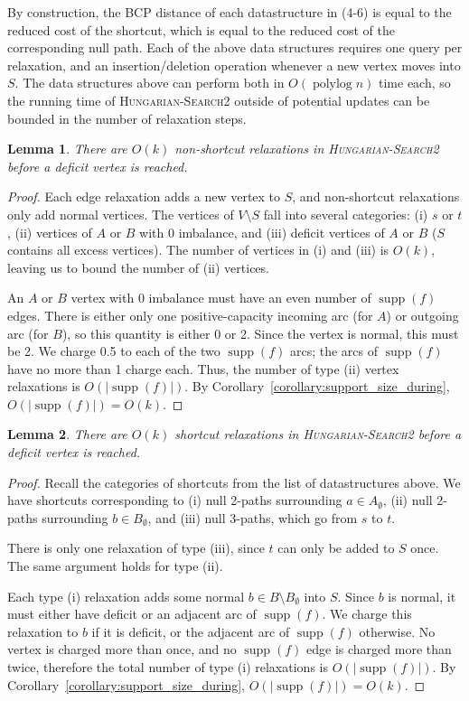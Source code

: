 \documentclass[11pt]{article}
\def\polylog{\mathop{\mathrm{polylog}}}
\def\supp{\operatorname{supp}}
\theoremstyle{plain}
\newtheorem{lemma}{Lemma}[section]
\numberwithin{figure}{section}
\begin{document}
By construction, the BCP distance of each datastructure in (4-6) is equal to
the reduced cost of the shortcut, which is equal to the reduced cost of the
corresponding null path.
Each of the above data structures requires one query per relaxation, and an
insertion/deletion operation whenever a new vertex moves into $S$.
The data structures above can perform both in $O(\polylog n)$ time each, so the
running time of \textsc{Hungarian-Search2} outside of potential updates can be
bounded in the number of relaxation steps.

\begin{lemma}
\label{lemma:goldberg_hs_length1}
There are $O(k)$ non-shortcut relaxations in \textsc{Hungarian-Search2} before
a deficit vertex is reached.
\end{lemma}

\begin{proof}
Each edge relaxation adds a new vertex to $S$, and non-shortcut relaxations
only add normal vertices.
The vertices of $V \setminus S$ fall into several categories:
(i) $s$ or $t$, (ii) vertices of $A$ or $B$ with 0 imbalance, and (iii)
deficit vertices of $A$ or $B$ ($S$ contains all excess vertices).
The number of vertices in (i) and (iii) is $O(k)$, leaving us to bound the
number of (ii) vertices.

An $A$ or $B$ vertex with 0 imbalance must have an even number of $\supp(f)$
edges.
There is either only one positive-capacity incoming arc (for $A$) or outgoing
arc (for $B$), so this quantity is either 0 or 2.
Since the vertex is normal, this must be 2.
We charge 0.5 to each of the two $\supp(f)$ arcs; the arcs of $\supp(f)$
have no more than 1 charge each.
Thus, the number of type (ii) vertex relaxations is $O(|\supp(f)|)$.
By Corollary~\ref{corollary:support_size_during}, $O(|\supp(f)|) = O(k)$.
\end{proof}

\begin{lemma}
\label{lemma:goldberg_hs_length2}
There are $O(k)$ shortcut relaxations in \textsc{Hungarian-Search2} before a
deficit vertex is reached.
\end{lemma}

\begin{proof}
Recall the categories of shortcuts from the list of datastructures above.
We have shortcuts corresponding to (i) null 2-paths surrounding
$a \in A_\emptyset$, (ii) null 2-paths surrounding $b \in B_\emptyset$, and
(iii) null 3-paths, which go from $s$ to $t$.

There is only one relaxation of type (iii), since $t$ can only be added to $S$
once.
The same argument holds for type (ii).

Each type (i) relaxation adds some normal $b \in B \setminus B_\emptyset$
into $S$.
Since $b$ is normal, it must either have deficit or an adjacent arc of
$\supp(f)$.
We charge this relaxation to $b$ if it is deficit, or the adjacent arc of
$\supp(f)$ otherwise.
No vertex is charged more than once, and no $\supp(f)$ edge is charged more
than twice, therefore the total number of type (i) relaxations is
$O(|\supp(f)|)$.
By Corollary~\ref{corollary:support_size_during}, $O(|\supp(f)|) = O(k)$.
\end{proof}
\end{document}
